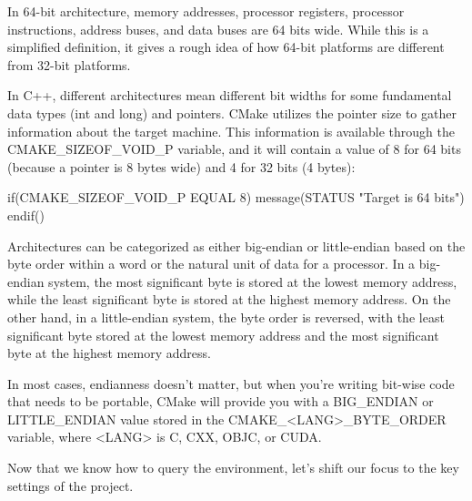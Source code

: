
In 64-bit architecture, memory addresses, processor registers, processor instructions, address buses, and data buses are 64 bits wide. While this is a simplified definition, it gives a rough idea of how 64-bit platforms are different from 32-bit platforms.

In C++, different architectures mean different bit widths for some fundamental data types (int and long) and pointers. CMake utilizes the pointer size to gather information about the target machine. This information is available through the CMAKE\_SIZEOF\_VOID\_P variable, and it will contain a value of 8 for 64 bits (because a pointer is 8 bytes wide) and 4 for 32 bits (4 bytes):

\begin{cmake}
if(CMAKE_SIZEOF_VOID_P EQUAL 8)
    message(STATUS "Target is 64 bits")
endif()
\end{cmake}


Architectures can be categorized as either big-endian or little-endian based on the byte order within a word or the natural unit of data for a processor. In a big-endian system, the most significant byte is stored at the lowest memory address, while the least significant byte is stored at the highest memory address. On the other hand, in a little-endian system, the byte order is reversed, with the least significant byte stored at the lowest memory address and the most significant byte at the highest memory address.

In most cases, endianness doesn’t matter, but when you’re writing bit-wise code that needs to be portable, CMake will provide you with a BIG\_ENDIAN or LITTLE\_ENDIAN value stored in the CMAKE\_<LANG>\_BYTE\_ORDER variable, where <LANG> is C, CXX, OBJC, or CUDA.

Now that we know how to query the environment, let’s shift our focus to the key settings of the project.

















